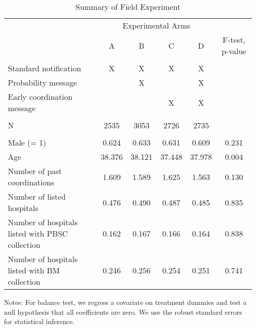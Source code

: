 \documentclass[12pt, a4paper]{article}
\begin{document}
\begin{table}

\caption{\label{tab:summary}Summary of Field Experiment}
\centering
\fontsize{9}{11}\selectfont
\begin{threeparttable}
\begin{tabular}[t]{lccccc}
\toprule
\multicolumn{1}{c}{ } & \multicolumn{4}{c}{Experimental Arms} & \multicolumn{1}{c}{ } \\
\cmidrule(l{3pt}r{3pt}){2-5}
 & A & B & C & D & F-test, p-value\\
\midrule
\addlinespace[0.3em]
\multicolumn{6}{l}{\textbf{A. Interventions}}\\
\hspace{1em}Standard notification & X & X & X & X & \\
\hspace{1em}Probability message &  & X &  & X & \\
\hspace{1em}Early coordination message &  &  & X & X & \\
\addlinespace[0.3em]
\multicolumn{6}{l}{\textbf{B. Sample Size}}\\
\hspace{1em}N & 2535 & 3053 & 2726 & 2735 & \\
\addlinespace[0.3em]
\multicolumn{6}{l}{\textbf{C. Balance Test}}\\
\hspace{1em}Male (= 1) & 0.624 & 0.633 & 0.631 & 0.609 & 0.231\\
\hspace{1em}Age & 38.376 & 38.121 & 37.448 & 37.978 & 0.004\\
\hspace{1em}Number of past coordinations & 1.609 & 1.589 & 1.625 & 1.563 & 0.130\\
\hspace{1em}Number of listed hospitals & 0.476 & 0.490 & 0.487 & 0.485 & 0.835\\
\hspace{1em}Number of hospitals listed with PBSC collection & 0.162 & 0.167 & 0.166 & 0.164 & 0.838\\
\hspace{1em}Number of hospitals listed with BM collection & 0.246 & 0.256 & 0.254 & 0.251 & 0.741\\
\bottomrule
\end{tabular}
\begin{tablenotes}
\item Notes: For balance test, we regress a covariate on treatment dummies and test a null hypothesis that all coefficients are zero. We use the robust standard errors for statistical inference.
\end{tablenotes}
\end{threeparttable}
\end{table}
\end{document}
